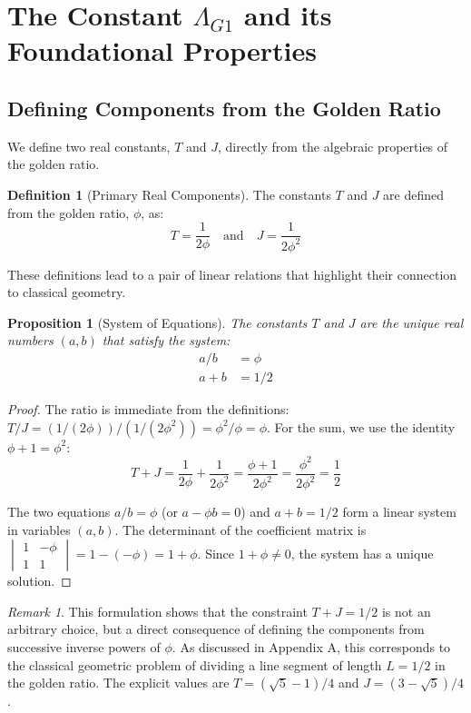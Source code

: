 \documentclass{amsart}
\theoremstyle{plain}
\newtheorem{proposition}[theorem]{Proposition}
\theoremstyle{definition}
\newtheorem{definition}[theorem]{Definition}
\theoremstyle{remark}
\newtheorem*{remark}{Remark}
\newcommand{\LambdaG}{\Lambda_{G1}}
\newcommand{\phiG}{\phi}
\begin{document}
\section{The Constant \texorpdfstring{$\LambdaG$}{Lambda\_G1} and its Foundational Properties}

\subsection{Defining Components from the Golden Ratio}
We define two real constants, $T$ and $J$, directly from the algebraic properties of the golden ratio.
\begin{definition}[Primary Real Components]
The constants $T$ and $J$ are defined from the golden ratio, $\phiG$, as:
$$ T = \frac{1}{2\phiG} \quad \text{and} \quad J = \frac{1}{2\phiG^2} $$ 

\end{definition}

These definitions lead to a pair of linear relations that highlight their connection to classical geometry.
\begin{proposition}[System of Equations]
The constants $T$ and $J$ are the unique real numbers $(a,b)$ that satisfy the system:
\begin{align}
    a/b &= \phiG \\
    a+b &= 1/2
\end{align} 

\end{proposition}
\begin{proof}
The ratio is immediate from the definitions: $T/J = (1/(2\phiG))/(1/(2\phiG^2)) = \phiG^2/\phiG = \phiG$. For the sum, we use the identity $\phiG+1 = \phiG^2$:
$$ T+J = \frac{1}{2\phiG} + \frac{1}{2\phiG^2} = \frac{\phiG+1}{2\phiG^2} = \frac{\phiG^2}{2\phiG^2} = \frac{1}{2} $$ 

The two equations $a/b = \phiG$ (or $a - \phiG b = 0$) and $a+b=1/2$ form a linear system in variables $(a,b)$. The determinant of the coefficient matrix is $\begin{vmatrix} 1 & -\phiG \\ 1 & 1 \end{vmatrix} = 1 - (-\phiG) = 1+\phiG$. Since $1+\phiG \neq 0$, the system has a unique solution.
\end{proof}

\begin{remark}
This formulation shows that the constraint $T+J=1/2$ is not an arbitrary choice, but a direct consequence of defining the components from successive inverse powers of $\phiG$. As discussed in Appendix A, this corresponds to the classical geometric problem of dividing a line segment of length $L=1/2$ in the golden ratio. The explicit values are $T = (\sqrt{5}-1)/4$ and $J = (3-\sqrt{5})/4$.
\end{remark}
\end{document}
